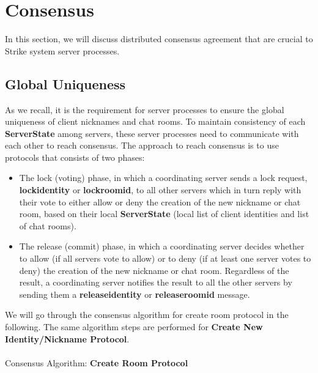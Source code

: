 \documentclass[dareport.tex]{subfiles}
\begin{document}
\section{Consensus} \label{sec:consensus}

In this section, we will discuss distributed consensus agreement that are crucial to Strike system server processes.

\subsection{Global Uniqueness}\label{globaluniqueness}
As we recall, it is the requirement for server processes to ensure the global uniqueness of client nicknames and chat rooms. To maintain consistency of each \textbf{ServerState} among servers, these server processes need to communicate with each other to reach consensus. The approach to reach consensus is to use protocols that consists of two phases: 
\begin{itemize}[leftmargin=*]
\item The lock (voting) phase, in which a coordinating server sends a lock request, \textbf{lockidentity} or \textbf{lockroomid}, to all other servers which in turn reply with their vote to either allow or deny the creation of the new nickname or chat room, based on their local \textbf{ServerState} (local list of client identities and list of chat rooms).

\item The release (commit) phase, in which a coordinating server decides whether to allow (if all servers vote to allow) or to deny (if at least one server votes to deny) the creation of the new nickname or chat room. Regardless of the result, a coordinating server notifies the result to all the other servers by sending them a \textbf{releaseidentity} or \textbf{releaseroomid} message.
\end{itemize}
We will go through the consensus algorithm for create room protocol in the following. The same algorithm steps are performed for \textbf{Create New Identity/Nickname Protocol}.
\\
\\
\noindent Consensus Algorithm: \textbf{Create Room Protocol}
\end{document}
